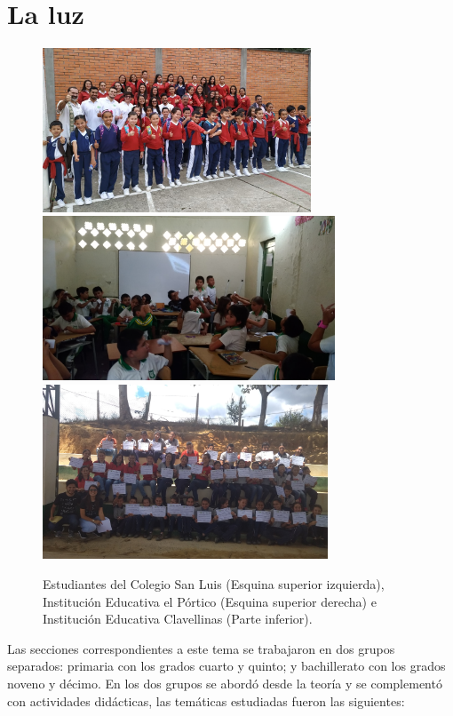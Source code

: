 \documentclass[a4paper,10pt]{article}
\begin{document}
\section{La luz}

\begin{figure}[H]
    \centering
    \includegraphics[width=8.0cm]{Imagenes/foto2.jpeg}
    \includegraphics[width=8.7cm]{Imagenes/portico.jpg}
    \includegraphics[width=8.5cm]{Imagenes/certificadoclave.jpg}
    \caption{Estudiantes del Colegio San Luis (Esquina superior izquierda), Institución Educativa el Pórtico (Esquina superior derecha) e Institución Educativa Clavellinas (Parte inferior). }
\end{figure}

\noindent Las secciones correspondientes a este tema se trabajaron en dos grupos separados: primaria con los grados cuarto y quinto; y bachillerato con los grados noveno y décimo. En los dos grupos se abordó desde la teoría y se complementó con actividades didácticas, las temáticas estudiadas fueron las siguientes:
\end{document}
